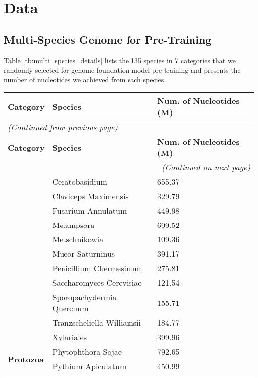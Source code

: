 \documentclass{article}
\begin{document}
\section{Data}

\subsection{Multi-Species Genome for Pre-Training}
\label{subsec:appen_data_pretrain}

Table \ref{tb:multi_species_details} lists the 135 species in 7 categories that we randomly selected for genome foundation model pre-training and presents the number of nucleotides we achieved from each species.

\begin{longtable}{lll}

	\toprule
	\textbf{Category} & \textbf{Species} & \textbf{Num. of Nucleotides (M)}  \\
	\midrule
	\endfirsthead
	\multicolumn{3}{l}{\textit{(Continued from previous page)}} \\
	\midrule
	\textbf{Category} & \textbf{Species} & \textbf{Num. of Nucleotides (M)} \\
	\midrule
	\endhead
	\midrule
	\multicolumn{3}{r}{\textit{(Continued on next page)}} \\
	\endfoot
	\endlastfoot

 	\multirow{10}{*}{\textbf{Fungi}} & Ceratobasidium & 655.37 \\
& Claviceps Maximensis & 329.79 \\
& Fusarium Annulatum & 449.98 \\
& Melampsora & 699.52 \\
& Metschnikowia & 109.36 \\
& Mucor Saturninus & 391.17 \\
& Penicillium Chermesinum & 275.81 \\
& Saccharomyces Cerevisiae & 121.54 \\
& Sporopachydermia Quercuum & 155.71 \\
& Tranzscheliella Williamsii & 184.77 \\
& Xylariales & 399.96 \\
	
	\midrule
	
	\multirow{2}{*}{\textbf{Protozoa}} &  Phytophthora Sojae & 792.65 \\
& Pythium Apiculatum & 450.99 \\
	

\end{longtable}
\end{document}
